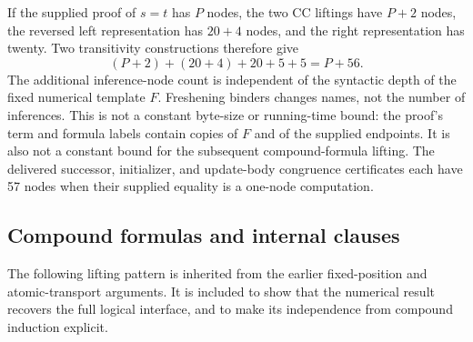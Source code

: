 \documentclass[11pt,letterpaper]{article}
\theoremstyle{definition}\newtheorem{definition}[theorem]{Definition}
\theoremstyle{remark}\newtheorem{remark}[theorem]{Remark}
\begin{document}
If the supplied proof of $s=t$ has $P$ nodes, the two CC liftings have
$P+2$ nodes, the reversed left representation has $20+4$ nodes,
and the right representation has twenty. Two transitivity constructions
therefore give
\[
                  (P+2)+(20+4)+20+5+5=P+56.
\]
The additional inference-node count is independent of the syntactic
depth of the fixed numerical template $F$. Freshening binders changes
names, not the number of inferences. This is not a constant byte-size
or running-time bound: the proof's term and formula labels contain
copies of $F$ and of the supplied endpoints. It is also not a constant
bound for the subsequent compound-formula lifting. The delivered
successor, initializer, and update-body congruence certificates each
have 57 nodes when their supplied equality is a one-node computation.

\subsection{Compound formulas and internal clauses}

The following lifting pattern is inherited from the earlier
fixed-position and atomic-transport arguments. It is included to show
that the numerical result recovers the full logical interface, and to
make its independence from compound induction explicit.
\end{document}
